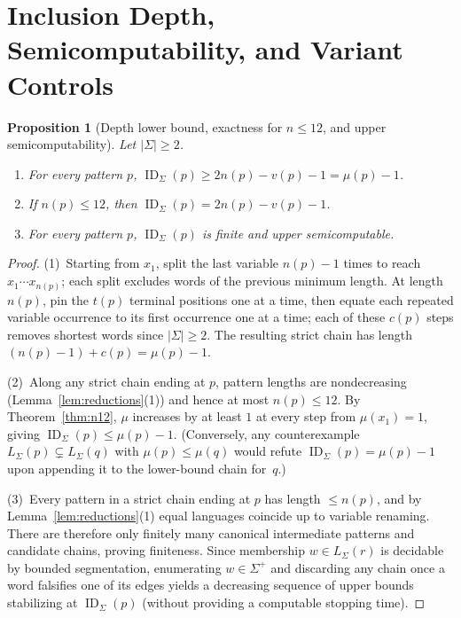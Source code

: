 \documentclass[11pt]{article}
\theoremstyle{plain}
\newtheorem{proposition}[theorem]{Proposition}
\theoremstyle{definition}
\theoremstyle{remark}
\DeclareMathOperator{\ID}{ID}
\begin{document}
\section{Inclusion Depth, Semicomputability, and Variant Controls}

\begin{proposition}[Depth lower bound, exactness for $n \le 12$, and upper semicomputability]\label{prop:depth}
Let $|\Sigma| \ge 2$.
\begin{enumerate}[label=\textup{(\arabic*)}]
\item For every pattern $p$, $\ID_\Sigma(p) \ge 2n(p) - v(p) - 1 = \mu(p) - 1$.
\item If $n(p) \le 12$, then $\ID_\Sigma(p) = 2n(p) - v(p) - 1$.
\item For every pattern $p$, $\ID_\Sigma(p)$ is finite and upper semicomputable.
\end{enumerate}
\end{proposition}

\begin{proof}
(1)~Starting from $x_1$, split the last variable $n(p)-1$ times to reach $x_1 \cdots x_{n(p)}$; each split excludes words of the previous minimum length.
At length $n(p)$, pin the $t(p)$ terminal positions one at a time, then equate each repeated variable occurrence to its first occurrence one at a time; each of these $c(p)$ steps removes shortest words since $|\Sigma| \ge 2$.
The resulting strict chain has length $(n(p)-1) + c(p) = \mu(p) - 1$.

(2)~Along any strict chain ending at $p$, pattern lengths are nondecreasing (Lemma~\ref{lem:reductions}(1)) and hence at most $n(p) \le 12$.
By Theorem~\ref{thm:n12}, $\mu$ increases by at least $1$ at every step from $\mu(x_1) = 1$, giving $\ID_\Sigma(p) \le \mu(p) - 1$.
(Conversely, any counterexample $L_\Sigma(p) \subsetneq L_\Sigma(q)$ with $\mu(p) \le \mu(q)$ would refute $\ID_\Sigma(p) = \mu(p) - 1$ upon appending it to the lower-bound chain for~$q$.)

(3)~Every pattern in a strict chain ending at $p$ has length $\le n(p)$, and by Lemma~\ref{lem:reductions}(1) equal languages coincide up to variable renaming.
There are therefore only finitely many canonical intermediate patterns and candidate chains, proving finiteness.
Since membership $w \in L_\Sigma(r)$ is decidable by bounded segmentation, enumerating $w \in \Sigma^+$ and discarding any chain once a word falsifies one of its edges yields a decreasing sequence of upper bounds stabilizing at $\ID_\Sigma(p)$ (without providing a computable stopping time).
\end{proof}
\end{document}
